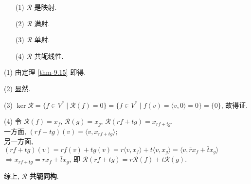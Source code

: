 \documentclass{note}
\begin{document}
\begin{itemize}
    \item[(1)] $\mathcal{R}$ 是映射.
    \item[(2)] $\mathcal{R}$ 满射.
    \item[(3)] $\mathcal{R}$ 单射.
    \item[(4)] $\mathcal{R}$ 共轭线性.
\end{itemize}
\begin{pf}
    \item[(1)] 由定理 \ref{thm-9.15} 即得.
    \item[(2)] 显然.
    \item[(3)] $\ker\mathcal{R}=\{f\in V^*\mid\mathcal{R}(f)=0\}=\{f\in V^*\mid f(v)=\langle v,0\rangle=0\}=\{0\}$, 故得证.
    \item[(4)] 令 $\mathcal{R}(f)=x_f$, $\mathcal{R}(g)=x_g$, $\mathcal{R}(rf+tg)=x_{rf+tg}$.\\
    一方面, $(rf+tg)(v)=\langle v,x_{rf+tg}\rangle$;\\
    另一方面, $(rf+tg)(v)=rf(v)+tg(v)=r\langle v,x_f\rangle+t\langle v,x_g\rangle=\langle v,\bar{r}x_f+\bar{t}x_g\rangle$\\
    $\Longrightarrow x_{rf+tg}=\bar{r}x_f+\bar{t}x_g$, 即 $\mathcal{R}(rf+tg)=r\mathcal{R}(f)+t\mathcal{R}(g)$.
\end{pf}
综上, $\mathcal{R}$ \textbf{共轭同构}.
\ifx\allfiles\undefined
\end{document}
